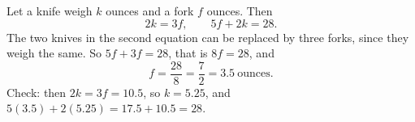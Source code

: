 Let a knife weigh $k$ ounces and a fork $f$ ounces. Then
\[
2k=3f,\qquad 5f+2k=28 .
\]
The two knives in the second equation can be replaced by three forks, since they weigh the same. So $5f+3f=28$, that is $8f=28$, and
\[
f=\dfrac{28}{8}=\boxed{\dfrac{7}{2}=3.5}\ \text{ounces}.
\]
Check: then $2k=3f=10.5$, so $k=5.25$, and $5(3.5)+2(5.25)=17.5+10.5=28$.
